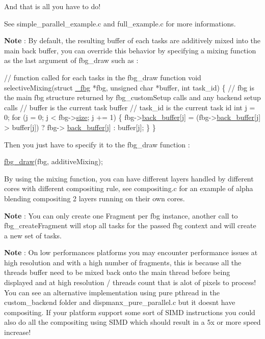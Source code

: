 And that is all you have to do!

See {\ttfamily simple\+\_\+parallel\+\_\+example.\+c} and {\ttfamily full\+\_\+example.\+c} for more informations.

{\bfseries Note} \+: By default, the resulting buffer of each tasks are additively mixed into the main back buffer, you can override this behavior by specifying a mixing function as the last argument of {\ttfamily fbg\+\_\+draw} such as \+:


\begin{DoxyCode}
\textcolor{comment}{// function called for each tasks in the fbg\_draw function}
\textcolor{keywordtype}{void} selectiveMixing(\textcolor{keyword}{struct} \hyperlink{struct__fbg}{\_fbg} *fbg, \textcolor{keywordtype}{unsigned} \textcolor{keywordtype}{char} *buffer, \textcolor{keywordtype}{int} task\_id) \{
    \textcolor{comment}{// fbg is the main fbg structure returned by fbg\_customSetup calls and any backend setup calls}
    \textcolor{comment}{// buffer is the current task buffer}
    \textcolor{comment}{// task\_id is the current task id}
    \textcolor{keywordtype}{int} j = 0;
    \textcolor{keywordflow}{for} (j = 0; j < fbg->\hyperlink{struct__fbg_a84fb220d4804cba22176997898e75b73}{size}; j += 1) \{
        fbg->\hyperlink{struct__fbg_a907e7fc97965b972c17114c885e53735}{back\_buffer}[j] = (fbg->\hyperlink{struct__fbg_a907e7fc97965b972c17114c885e53735}{back\_buffer}[j] > buffer[j]) ? fbg->
      \hyperlink{struct__fbg_a907e7fc97965b972c17114c885e53735}{back\_buffer}[j] : buffer[j];
    \}
\}
\end{DoxyCode}


Then you just have to specify it to the {\ttfamily fbg\+\_\+draw} function \+:


\begin{DoxyCode}
\hyperlink{fbgraphics_8h_a2dfb2f17bc31e161868e6baf1c391816}{fbg\_draw}(fbg, additiveMixing);
\end{DoxyCode}


By using the mixing function, you can have different layers handled by different cores with different compositing rule, see {\ttfamily compositing.\+c} for an example of alpha blending compositing 2 layers running on their own cores.

{\bfseries Note} \+: You can only create one Fragment per fbg instance, another call to {\ttfamily fbg\+\_\+create\+Fragment} will stop all tasks for the passed fbg context and will create a new set of tasks.

{\bfseries Note} \+: On low performances platforms you may encounter performance issues at high resolution and with a high number of fragments, this is because all the threads buffer need to be mixed back onto the main thread before being displayed and at high resolution / threads count that is alot of pixels to process! You can see an alternative implementation using pure pthread in the {\ttfamily custom\+\_\+backend} folder and {\ttfamily dispmanx\+\_\+pure\+\_\+parallel.\+c} but it doesn\textquotesingle{}t have compositing. If your platform support some sort of S\+I\+MD instructions you could also do all the compositing using S\+I\+MD which should result in a 5x or more speed increase!

